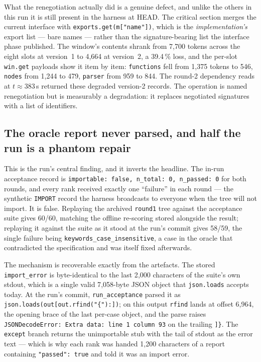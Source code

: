 \documentclass[11pt]{article}
\begin{document}
What the renegotiation actually did is a genuine defect, and unlike the others in this run it
is still present in the harness at HEAD. The critical section merges the current interface
with \texttt{exports.get(m["name"])}, which is the \emph{implementation's} export list --- bare
names --- rather than the signature-bearing list the interface phase published. The window's
contents shrank from 7{,}700 tokens across the eight slots at version~1 to 4{,}664 at
version~2, a 39.4\,\% loss, and the per-slot \texttt{win.get} payloads show it item by item:
\texttt{functions} fell from 1{,}375 tokens to 546, \texttt{nodes} from 1{,}244 to 479,
\texttt{parser} from 959 to 844. The round-2 dependency reads at $t\approx383$\,s returned
these degraded version-2 records. The operation is named renegotiation but is measurably a
degradation: it replaces negotiated signatures with a list of identifiers.

\subsection*{The oracle report never parsed, and half the run is a phantom repair}

This is the run's central finding, and it inverts the headline. The in-run acceptance record
is \texttt{importable: false, n\_total: 0, n\_passed: 0} for both rounds, and every rank
received exactly one ``failure'' in each round --- the synthetic \texttt{IMPORT} record the
harness broadcasts to everyone when the tree will not import. It is false. Replaying the
archived \texttt{round1} tree against the acceptance suite gives 60/60, matching the offline
re-scoring stored alongside the result; replaying it against the suite as it stood at the
run's commit gives 58/59, the single failure being \texttt{keywords\_case\_insensitive}, a
case in the oracle that contradicted the specification and was itself fixed afterwards.

The mechanism is recoverable exactly from the artefacts. The stored \texttt{import\_error} is
byte-identical to the last 2{,}000 characters of the suite's own stdout, which is a single
valid 7{,}058-byte JSON object that \texttt{json.loads} accepts today. At the run's commit,
\texttt{run\_acceptance} parsed it as \texttt{json.loads(out[out.rfind("\{"):])}; on this
output \texttt{rfind} lands at offset 6{,}964, the opening brace of the last per-case object,
and the parse raises \texttt{JSONDecodeError: Extra data: line 1 column 93} on the trailing
\texttt{]\}}. The \texttt{except} branch returns the unimportable stub with the tail of stdout
as the error text --- which is why each rank was handed 1{,}200 characters of a report
containing \texttt{"passed": true} and told it was an import error.
\end{document}
